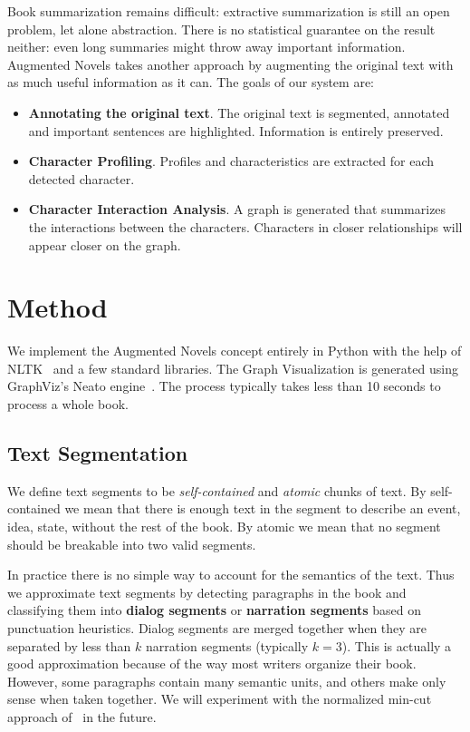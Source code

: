 \documentclass[twoside]{article}
\begin{document}
\begin{multicols}{2}
Book summarization remains difficult: extractive summarization is still an open problem, let alone abstraction. There is no statistical guarantee on the result neither: even long summaries might throw away important information. Augmented Novels takes another approach by augmenting the original text with as much useful information as it can. The goals of our system are:
\begin{itemize}
\item \textbf{Annotating the original text}. The original text is segmented, annotated and important sentences are highlighted. Information is entirely preserved.
\item \textbf{Character Profiling}. Profiles and characteristics are extracted for each detected character.
\item \textbf{Character Interaction Analysis}. A graph is generated that summarizes the interactions between the characters. Characters in closer relationships will appear closer on the graph.
\end{itemize}



\section{Method \label{section:method}}

We implement the Augmented Novels concept entirely in Python with the help of NLTK~\cite{bird2009natural} and a few standard libraries. The Graph Visualization is generated using GraphViz's Neato engine~\cite{ellson2002graphviz}. The process typically takes less than 10 seconds to process a whole book.

\subsection{Text Segmentation}

We define text segments to be \emph{self-contained} and \emph{atomic} chunks of text. By self-contained we mean that there is enough text in the segment to describe an event, idea, state, without the rest of the book. By atomic we mean that no segment should be breakable into two valid segments.

In practice there is no simple way to account for the semantics of the text. Thus we approximate text segments by detecting paragraphs in the book and classifying them into \textbf{dialog segments} or \textbf{narration segments} based on punctuation heuristics. Dialog segments are merged together when they are separated by less than $k$ narration segments (typically $k=3$). This is actually a good approximation because of the way most writers organize their book. However, some paragraphs contain many semantic units, and others make only sense when taken together. We will experiment with the normalized min-cut approach of~\cite{mihalcea2007explorations} in the future.


\end{multicols}
\end{document}
